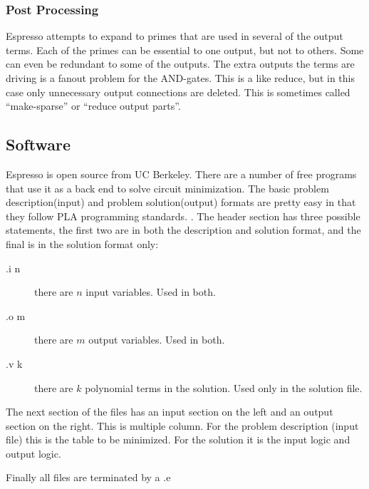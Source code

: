 \subsubsection{Post Processing}

Espresso attempts to expand to primes that are used in several of the output terms.  Each of the primes can be essential to one output, but not to others.  Some can even be redundant to some of the outputs.  The extra outputs the terms are driving is a fanout problem for the AND-gates.  This is a like reduce, but in this case only unnecessary output connections are deleted.  This is sometimes called ``make-sparse'' or ``reduce output parts''.


\subsection{Software}

Espresso is open source from UC Berkeley.  There are a number of free programs that use it as a back end to solve circuit minimization.  The basic problem description(input) and problem solution(output) formats are pretty easy in that they follow PLA programming standards.  .  The header section has three possible statements, the first two are in both the description and solution format, and the final is in the solution format only:
\begin{description}
\item[.i n] there are $n$ input variables.  Used in both.
\item[.o m] there are $m$ output variables.  Used in both.
\item[.v k] there are $k$ polynomial terms in the solution. Used only in the solution file.
\end{description}
The next section of the files has an input section on the left and an output section on the right.  This is multiple column.  For the problem description (input file) this is the table to be minimized.  For the solution it is the input logic and output logic.

Finally all files are terminated by a .e 